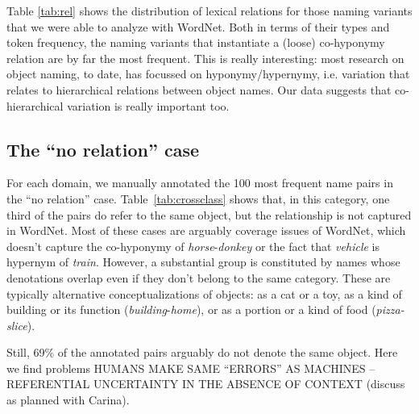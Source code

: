  

Table \ref{tab:rel} shows the distribution of lexical relations for those naming variants that we were able to analyze with WordNet.
Both in terms of their types and token frequency, the naming variants that instantiate a (loose) co-hyponymy relation are by far the most frequent.
This is really interesting: most research on object naming, to date, has focussed on hyponymy/hypernymy, i.e. variation that relates to hierarchical relations between object names.
Our data suggests that co-hierarchical variation is really important too.

\subsection{The ``no relation'' case}

For each domain, we manually annotated the 100 most frequent name pairs in the ``no relation'' case. Table~\ref{tab:crossclass} shows that, in this category, one third of the pairs do refer to the same object, but the relationship is not captured in WordNet. 
Most of these cases are arguably coverage issues of WordNet, which doesn't capture the co-hyponymy of \textit{horse}-\textit{donkey} or the fact that \textit{vehicle} is hypernym of \textit{train}.
However, a substantial group is constituted by names whose denotations overlap even if they don't belong to the same category. These are typically alternative conceptualizations of objects: as a cat or a toy, as a kind of building or its function (\textit{building}-\textit{home}), or as a portion or a kind of food (\textit{pizza-slice}).

Still, 69\% of the annotated pairs arguably do not denote the same object. Here we find problems HUMANS MAKE SAME ``ERRORS'' AS MACHINES -- REFERENTIAL UNCERTAINTY IN THE ABSENCE OF CONTEXT (discuss as planned with Carina).


